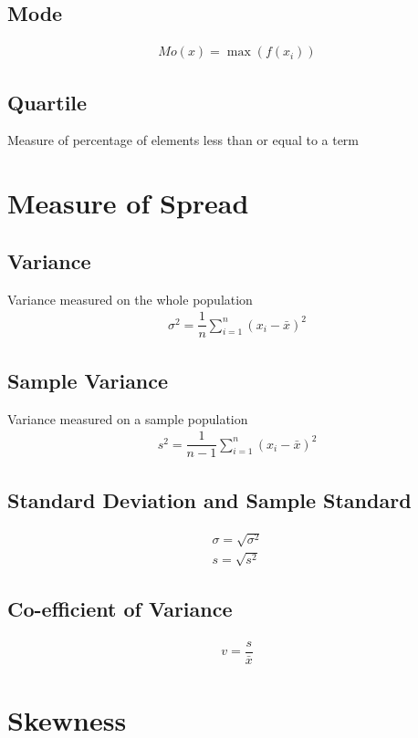 \documentclass[openany, oneside]{book}
\begin{document}
\subsection{Mode}
\begin{align}
	Mo(x) = \max(f(x_i))
\end{align}

\subsection{Quartile}
Measure of percentage of elements less than or equal to a term

\section{Measure of Spread}
\subsection{Variance}
Variance measured on the whole population
\begin{align}
	\sigma^2 = \dfrac{1}{n} \sum_{i=1}^{n} \left( x_i - \bar{x} \right)^2
\end{align}
\subsection{Sample Variance}
Variance measured on a sample population
\begin{align}
	s^2 = \dfrac{1}{n-1} \sum_{i=1}^{n} \left( x_i - \bar{x} \right)^2
\end{align}

\subsection{Standard Deviation and Sample Standard}
\begin{align}
	\sigma = \sqrt{\sigma^2}\\
	s=\sqrt{s^2}
\end{align}

\subsection{Co-efficient of Variance}
\begin{align}
	v = \dfrac{s}{\bar{x}}
\end{align}

\section{Skewness}
\end{document}
